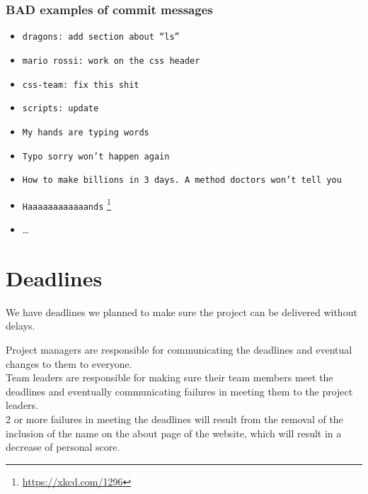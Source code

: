 \documentclass[hidelinks,12pt,a4paper,numbers=enddot]{scrartcl}
\begin{document}
\subsubsection{BAD examples of commit messages}

\begin{itemize}
\item \texttt{dragons: add section about ``ls''}
\item \texttt{mario rossi: work on the css header}
\item \texttt{css-team: fix this shit}
\item \texttt{scripts: update}
\item \texttt{My hands are typing words}
\item \texttt{Typo sorry won't happen again}
\item \texttt{How to make billions in 3 days. A method doctors won't tell you}
\item \texttt{Haaaaaaaaaaaands} \footnote{\url{https://xkcd.com/1296}}
\item \ldots
\end{itemize}

\section{Deadlines}\label{deadlines}

We have deadlines  we planned to make sure the project can be delivered without delays.

Project managers are responsible for communicating the deadlines
and eventual changes to them to everyone.\\

Team leaders are responsible for making sure their team members
meet the deadlines and eventually communicating failures in meeting
them to the project leaders.\\

2 or more failures in meeting the deadlines will result from the removal
of the inclusion of the name on the about page of the website, which
will result in a decrease of personal score.
\end{document}

